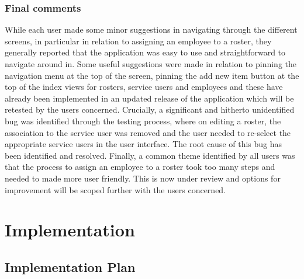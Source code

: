 \documentclass[a4paper,Times New Roman 11pt]{article}
\begin{document}
\subsubsection{Final comments}
While each user made some minor suggestions in navigating through the different screens, in particular in relation to assigning an employee to a roster, they generally reported that the application was easy to use and straightforward to navigate around in. Some useful suggestions were made in relation to pinning the navigation menu at the top of the screen, pinning the add new item button at the top of the index views for rosters, service users and employees and these have already been implemented in an updated release of the application which will be retested by the users concerned. Crucially, a significant and hitherto unidentified bug was identified through the testing process, where on editing a roster, the association to the service user was removed and the user needed to re-select the appropriate service users in the user interface. The root cause of this bug has been identified and resolved. Finally, a common theme identified by all users was that the process to assign an employee to a roster took too many steps and needed to made more user friendly. This is now under review and options for improvement will be scoped further with the users concerned.
\newpage
\section {Implementation}
\subsection {Implementation Plan}
\end{document}
